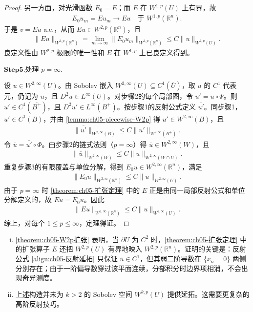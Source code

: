\documentclass[../../main.tex]{subfiles}%
\begin{document}
\begin{proof}
另一方面，对光滑函数 $E_0=E$；而 $E$ 在 $W^{1,p}(U)$ 上有界，故
\begin{align*}
E_0u_m=Eu_m\to Eu\quad\text{于 }W^{1,p}(\mathbb{R}^{n}).
\end{align*}
于是 $v=Eu$ a.e.，从而 $Eu\in W^{2,p}(\mathbb{R}^{n})$，且
\begin{align*}
\|Eu\|_{W^{2,p}(\mathbb{R}^{n})}
=\lim_{m\to\infty}\|E_0u_m\|_{W^{2,p}(\mathbb{R}^{n})}
\leqslant C\|u\|_{W^{2,p}(U)}.
\end{align*}
良定义性由 $W^{2,p}$ 极限的唯一性和 $E$ 在 $W^{1,p}$ 上已良定义得到。

\noindent$\mathbf{Step}\bm{5}$.{\heiti 处理 $p=\infty$.}

设 $u\in W^{2,\infty}(U)$。由 Sobolev 嵌入 $W^{2,\infty}(U)\subseteq C^{1}(\overline U)$，取 $u$ 的 $C^{1}$ 代表元，仍记为 $u$，且 $D^{2}u\in L^{\infty}(U)$。对步骤2的每个局部图，令 $u'=u\circ\Psi$。则 $u'\in C^{1}(\overline{B^{+}})$，且 $D^{2}u'\in L^{\infty}(B^{+})$。按步骤1的反射公式定义 $\overline{u'}$。同步骤1，$\overline{u'}\in C^{1}(B)$，并由 \cref{lemma:ch05-piecewise-W2p} 得 $\overline{u'}\in W^{2,\infty}(B)$，且
\begin{align*}
\|\overline{u'}\|_{W^{2,\infty}(B)}
\leqslant C\|u'\|_{W^{2,\infty}(B^{+})}.
\end{align*}
令 $\overline u=\overline{u'}\circ\Phi$。由步骤2的链式法则（$p=\infty$）得 $\overline u\in W^{2,\infty}(W)$，且
\begin{align*}
\|\overline u\|_{W^{2,\infty}(W)}
\leqslant C\|u\|_{W^{2,\infty}(W\cap U)}.
\end{align*}
重复步骤3的有限覆盖与单位分解，得到 $E_0u\in W^{2,\infty}(\mathbb{R}^{n})$，满足
\begin{align*}
\|E_0u\|_{W^{2,\infty}(\mathbb{R}^{n})}
\leqslant C\|u\|_{W^{2,\infty}(U)}.
\end{align*}
由于 $p=\infty$ 时 \cref{theorem:ch05-扩张定理} 中的 $E$ 正是由同一局部反射公式和单位分解定义的，故 $Eu=E_0u$。因此
\begin{align*}
\|Eu\|_{W^{2,\infty}(\mathbb{R}^{n})}
\leqslant C\|u\|_{W^{2,\infty}(U)}.
\end{align*}
综上，对每个 $1\leqslant p\leqslant\infty$，定理得证。
\end{proof}

\begin{remark}\label{remark:ch05-延拓注}
\leavevmode
\begin{enumerate}[(i)]
\item \cref{theorem:ch05-W2p扩张} 表明，当 $\partial U$ 为 $C^{2}$ 时，\cref{theorem:ch05-扩张定理} 中的扩张算子 $E$ 还把 $W^{2,p}(U)$ 有界地映入 $W^{2,p}(\mathbb{R}^{n})$。证明的关键是：反射公式 \eqref{align:ch05-反射延拓} 只保证 $\overline u\in C^{1}$，但其弱二阶导数在 $\{x_n=0\}$ 两侧分别存在；由于一阶偏导数穿过该平面连续，分部积分时边界项相消，不会出现奇异测度。
\item 上述构造并未为 $k>2$ 的 Sobolev 空间 $W^{k,p}(U)$ 提供延拓。这需要更复杂的高阶反射技巧。
\end{enumerate}
\end{remark}
\end{document}
